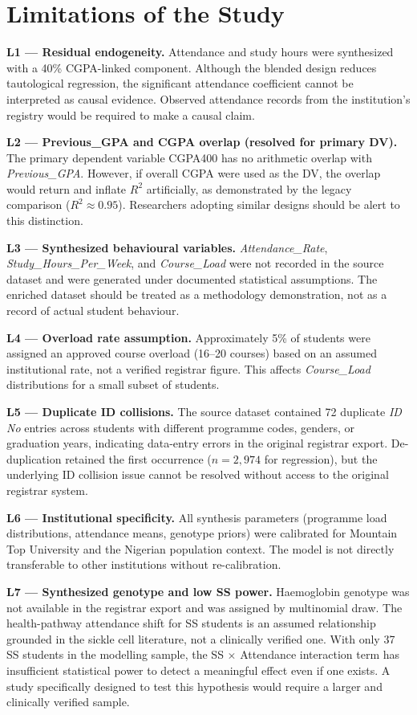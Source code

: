 \documentclass[12pt]{report}
\begin{document}
	\section{Limitations of the Study}
	\textbf{L1 --- Residual endogeneity.} Attendance and study hours were synthesized with a 40\% CGPA-linked component. Although the blended design reduces tautological regression, the significant attendance coefficient cannot be interpreted as causal evidence. Observed attendance records from the institution's registry would be required to make a causal claim.
	
	\textbf{L2 --- Previous\_GPA and CGPA overlap (resolved for primary DV).} The primary dependent variable CGPA400 has no arithmetic overlap with \textit{Previous\_GPA}. However, if overall CGPA were used as the DV, the overlap would return and inflate $R^2$ artificially, as demonstrated by the legacy comparison ($R^2 \approx 0.95$). Researchers adopting similar designs should be alert to this distinction.
	
	\textbf{L3 --- Synthesized behavioural variables.} \textit{Attendance\_Rate}, \textit{Study\_Hours\_Per\_Week}, and \textit{Course\_Load} were not recorded in the source dataset and were generated under documented statistical assumptions. The enriched dataset should be treated as a methodology demonstration, not as a record of actual student behaviour.
	
	\textbf{L4 --- Overload rate assumption.} Approximately 5\% of students were assigned an approved course overload (16--20 courses) based on an assumed institutional rate, not a verified registrar figure. This affects \textit{Course\_Load} distributions for a small subset of students.
	
	\textbf{L5 --- Duplicate ID collisions.} The source dataset contained 72 duplicate \textit{ID No} entries across students with different programme codes, genders, or graduation years, indicating data-entry errors in the original registrar export. De-duplication retained the first occurrence ($n = 2{,}974$ for regression), but the underlying ID collision issue cannot be resolved without access to the original registrar system.
	
	\textbf{L6 --- Institutional specificity.} All synthesis parameters (programme load distributions, attendance means, genotype priors) were calibrated for Mountain Top University and the Nigerian population context. The model is not directly transferable to other institutions without re-calibration.
	
	\textbf{L7 --- Synthesized genotype and low SS power.} Haemoglobin genotype was not available in the registrar export and was assigned by multinomial draw. The health-pathway attendance shift for SS students is an assumed relationship grounded in the sickle cell literature, not a clinically verified one. With only 37 SS students in the modelling sample, the SS $\times$ Attendance interaction term has insufficient statistical power to detect a meaningful effect even if one exists. A study specifically designed to test this hypothesis would require a larger and clinically verified sample.
	
\end{document}

